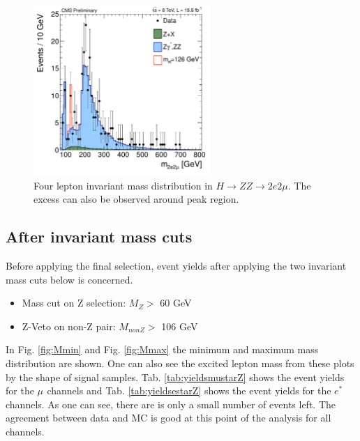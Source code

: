\begin{figure}[h!]
\begin{center}
\includegraphics[width=0.6\textwidth]{plot/2e2muZZMass_70-800_8TeV.pdf}
\end{center}
\caption{\label{fig:HIGref}Four lepton invariant mass distribution in $H\rightarrow$$ZZ$$\rightarrow 2e2\mu$. The excess can also be observed around peak region.}
\end{figure}

\clearpage

\subsection*{After invariant mass cuts}

Before applying the final selection, event yields after applying the two invariant mass cuts below is concerned.

\begin{itemize}
	\item Mass cut on Z selection: $M_{Z} >$ 60 GeV
	\item Z-Veto on non-Z pair: $M_{nonZ} >$ 106 GeV
\end{itemize}

In Fig. \ref{fig:Mmin} and Fig. \ref{fig:Mmax} the minimum and maximum mass distribution are shown. One can also see the excited lepton mass from these plots by the shape of signal samples. Tab. \ref{tab:yieldsmustarZ} shows the event yields for the $\mu^{}$ channels and Tab. \ref{tab:yieldsestarZ} shows the event yields for the $e^{*}$ channels. As one can see, there are is only a small number of events left. The agreement between data and MC is good at this point of the analysis for all channels. 

